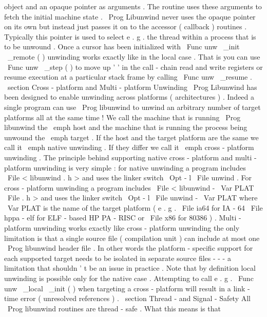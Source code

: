 object
and
an
opaque
pointer
as
arguments
.
The
routine
uses
these
arguments
to
fetch
the
initial
machine
state
.
\
Prog
{
Libunwind
}
never
uses
the
opaque
pointer
on
its
own
but
instead
just
passes
it
on
to
the
accessor
(
callback
)
routines
.
Typically
this
pointer
is
used
to
select
e
.
g
.
the
thread
within
a
process
that
is
to
be
unwound
.
Once
a
cursor
has
been
initialized
with
\
Func
{
unw
\
_init
\
_remote
}
(
)
unwinding
works
exactly
like
in
the
local
case
.
That
is
you
can
use
\
Func
{
unw
\
_step
}
(
)
to
move
up
'
'
in
the
call
-
chain
read
and
write
registers
or
resume
execution
at
a
particular
stack
frame
by
calling
\
Func
{
unw
\
_resume
}
.
\
section
{
Cross
-
platform
and
Multi
-
platform
Unwinding
}
\
Prog
{
Libunwind
}
has
been
designed
to
enable
unwinding
across
platforms
(
architectures
)
.
Indeed
a
single
program
can
use
\
Prog
{
libunwind
}
to
unwind
an
arbitrary
number
of
target
platforms
all
at
the
same
time
!
We
call
the
machine
that
is
running
\
Prog
{
libunwind
}
the
\
emph
{
host
}
and
the
machine
that
is
running
the
process
being
unwound
the
\
emph
{
target
}
.
If
the
host
and
the
target
platform
are
the
same
we
call
it
\
emph
{
native
}
unwinding
.
If
they
differ
we
call
it
\
emph
{
cross
-
platform
}
unwinding
.
The
principle
behind
supporting
native
cross
-
platform
and
multi
-
platform
unwinding
is
very
simple
:
for
native
unwinding
a
program
includes
\
File
{
<
libunwind
.
h
>
}
and
uses
the
linker
switch
\
Opt
{
-
l
}
\
File
{
unwind
}
.
For
cross
-
platform
unwinding
a
program
includes
\
File
{
<
libunwind
-
}
\
Var
{
PLAT
}
\
File
{
.
h
>
}
and
uses
the
linker
switch
\
Opt
{
-
l
}
\
File
{
unwind
-
}
\
Var
{
PLAT
}
where
\
Var
{
PLAT
}
is
the
name
of
the
target
platform
(
e
.
g
.
\
File
{
ia64
}
for
IA
-
64
\
File
{
hppa
-
elf
}
for
ELF
-
based
HP
PA
-
RISC
or
\
File
{
x86
}
for
80386
)
.
Multi
-
platform
unwinding
works
exactly
like
cross
-
platform
unwinding
the
only
limitation
is
that
a
single
source
file
(
compilation
unit
)
can
include
at
most
one
\
Prog
{
libunwind
}
header
file
.
In
other
words
the
platform
-
specific
support
for
each
supported
target
needs
to
be
isolated
in
separate
source
files
-
-
-
a
limitation
that
shouldn
'
t
be
an
issue
in
practice
.
Note
that
by
definition
local
unwinding
is
possible
only
for
the
native
case
.
Attempting
to
call
e
.
g
.
\
Func
{
unw
\
_local
\
_init
}
(
)
when
targeting
a
cross
-
platform
will
result
in
a
link
-
time
error
(
unresolved
references
)
.
\
section
{
Thread
-
and
Signal
-
Safety
}
All
\
Prog
{
libunwind
}
routines
are
thread
-
safe
.
What
this
means
is
that
